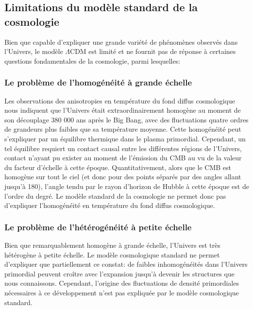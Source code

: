 \subsection{Limitations du modèle standard de la cosmologie}

Bien que capable d'expliquer une grande variété de phénomènes observés dans l'Univers, le modèle $\Lambda\mathrm{CDM}$ est limité et ne fournit pas de réponse à certaines questions fondamentales de la cosmologie, parmi lesquelles:


\subsubsection{Le problème de l'homogénéité à grande échelle} %
Les observations des anisotropies en température du fond diffus cosmologique nous indiquent que l'Univers était extraordinairement homogène au moment de son découplage 380 000 ans après le Big Bang, avec des fluctuations quatre ordres de grandeurs plus faibles que sa température moyenne.
Cette homogénéité peut s'expliquer par un équilibre thermique dans le plasma primordial.
Cependant, un tel équilibre requiert un contact causal entre les différentes régions de l'Univers, contact n'ayant pu exister au moment de l'émission du CMB au vu de la valeur du facteur d'échelle à cette époque.
Quantitativement, alors que le CMB est homogène sur tout le ciel (et donc pour des points séparés par des angles allant jusqu'à 180\textdegree), l'angle tendu par le rayon d'horizon de Hubble à cette époque est de l'ordre du degré.
Le modèle standard de la cosmologie ne permet donc pas d'expliquer l'homogénéité en température du fond diffus cosmologique.

\subsubsection{Le problème de l'hétérogénéité à petite échelle} %
Bien que remarquablement homogène à grande échelle, l'Univers est très hétérogène à petite échelle.
Le modèle cosmologique standard ne permet d'expliquer que partiellement ce constat: de faibles inhomogénéités dans l'Univers primordial peuvent croître avec l'expansion jusqu'à devenir les structures que nous connaissons.
Cependant, l'origine des fluctuations de densité primordiales nécessaires à ce développement n'est pas expliquée par le modèle cosmologique standard.

